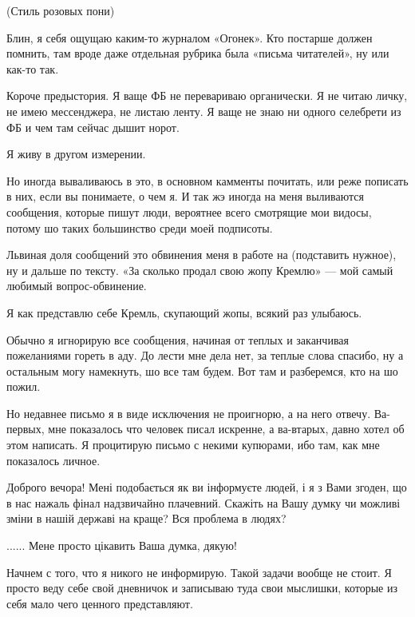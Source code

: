 \begin{multicols}{2} %
\setlength{\parindent}{0pt}


(Стиль розовых пони)

Блин, я себя ощущаю каким-то журналом «Огонек». Кто постарше должен помнить,
там вроде даже отдельная рубрика была «письма читателей», ну или как-то так.

Короче предыстория. Я ваще ФБ не перевариваю органически. Я не читаю личку, не
имею мессенджера, не листаю ленту. Я ваще не знаю ни одного селебрети из ФБ и
чем там сейчас дышит норот.

Я живу в другом измерении.

Но иногда вываливаюсь в это, в основном камменты почитать, или реже пописать в
них, если вы понимаете, о чем я. И так жэ иногда на меня выливаются сообщения,
которые пишут люди, вероятнее всего смотрящие мои видосы, потому шо таких
большинство среди моей подписоты.

Львиная доля сообщений это обвинения меня в работе на (подставить нужное), ну и
дальше по тексту. «За сколько продал свою жопу Кремлю» — мой самый любимый
вопрос-обвинение.

Я как представлю себе Кремль, скупающий жопы, всякий раз улыбаюсь.

Обычно я игнорирую все сообщения, начиная от теплых и заканчивая пожеланиями
гореть в аду. До лести мне дела нет, за теплые слова спасибо, ну а остальным
могу намекнуть, шо все там будем. Вот там и разберемся, кто на шо пожил.

Но недавнее письмо я в виде исключения не проигнорю, а на него отвечу.
Ва-первых, мне показалось что человек писал искренне, а ва-втарых, давно хотел
об этом написать. Я процитирую письмо с некими купюрами, ибо там, как мне
показалось личное. 

\begin{zzquote}
	
Доброго вечора! Мені подобається як ви інформуєте людей, і я з Вами згоден, що
в нас нажаль фінал надзвичайно плачевний. Скажіть на Вашу думку чи можливі
зміни в нашій державі на краще? Вся проблема в людях?

......
Мене просто цікавить Ваша думка, дякую!
\end{zzquote}

Начнем с того, что я никого не информирую. Такой задачи вообще не стоит. Я
просто веду себе свой дневничок и записываю туда свои мыслишки, которые из себя
мало чего ценного представляют.


\end{multicols}
